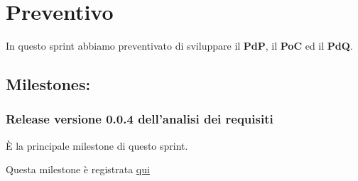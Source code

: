 \section{Preventivo}

In questo sprint abbiamo preventivato di sviluppare il \textbf{PdP}, il \textbf{PoC} ed il \textbf{PdQ}.

\subsection{Milestones:}  
\subsubsection{Release versione 0.0.4 dell'analisi dei requisiti}

È la principale milestone di questo sprint.

Questa milestone è registrata \href{https://github.com/SWEasabi/analisi-dei-requisiti/milestone/4}{qui}
